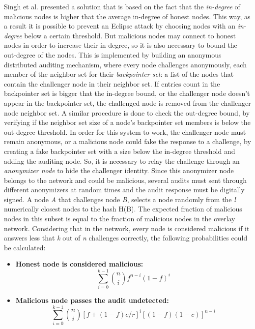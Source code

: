 Singh et al.\cite{Singh2006} presented a solution that is based on the fact that the \textit{in-degree} of malicious nodes is higher that the average in-degree of honest nodes.
This way, as a result it is possible to prevent an Eclipse attack by choosing nodes with an \textit{in-degree} below a certain threshold.
But malicious nodes may connect to honest nodes in order to increase their in-degree, so it is also necessary to bound the out-degree of the nodes.
This is implemented by building an anonymous distributed auditing mechanism, where every node challenges anonymously, each member of the neighbor set for their \textit{backpointer set}: a list of the nodes that contain the challenger node in their neighbor set.
If entries count in the backpointer set is bigger that the in-degree bound, or the challenger node doesn't appear in the backpointer set, the challenged node is removed from the challenger node neighbor set.
A similar procedure is done to check the out-degree bound, by verifying if the neighbor set size of a node's backpointer set members is below the out-degree threshold.
In order for this system to work, the challenger node must remain anonymous, or a malicious node could fake the response to a challenge, by creating a fake backpointer set with a size below the in-degree threshold and adding the auditing node.
So, it is necessary to relay the challenge through an \textit{anonymizer node} to hide the challenger identity.
Since this anonymizer node belongs to the network and could be malicious, several audits must sent through different anonymizers at random times and the audit response must be digitally signed.
A node \textit{A} that challenges node \textit{B}, selects a node randomly from the \textit{l} numerically closest nodes to the hash H(B).
The expected fraction of malicious nodes in this subset is equal to the fraction of malicious nodes in the overlay network.
Considering that in the network, every node is considered malicious if it answers less that \textit{k} out of \textit{n} challenges correctly, the following probabilities could be calculated:
\begin{itemize}
	\item \textbf{Honest node is considered malicious:}
	\begin{equation}
		\sum_{i=0}^{k-1} \binom{n}{i} f^{n-i} (1-f)^{i}
	\end{equation}
	\item \textbf{Malicious node passes the audit undetected:}
	\begin{equation}
		\sum_{i=0}^{k-1} \binom{n}{i} [f+(1-f)c/r]^{i} [(1-f)(1-c)]^{n-i}
	\end{equation}
\end{itemize}

